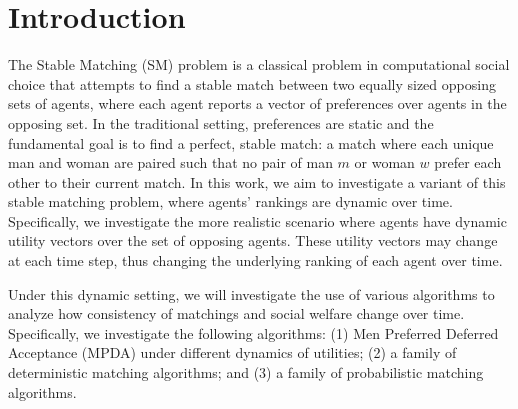 \section{Introduction}
 
The Stable Matching (SM) problem is a classical problem in computational social choice that attempts to find a stable match between two equally sized opposing sets of agents, where each agent reports a vector of preferences over agents in the opposing set. In the traditional setting, preferences are static and the fundamental goal is to find a perfect, stable match: a match where each unique man and woman are paired such that no pair of man $m$ or woman $w$ prefer each other to their current match. In this work, we aim to investigate a variant of this stable matching problem, where agents' rankings are dynamic over time. Specifically, we investigate the more realistic scenario where agents have dynamic utility vectors over the set of opposing agents. These utility vectors may change at each time step, thus changing the underlying ranking of each agent over time.

Under this dynamic setting, we will investigate the use of various algorithms to analyze how consistency of matchings and social welfare change over time. Specifically, we investigate the following algorithms: (1) Men Preferred Deferred Acceptance (MPDA) under different dynamics of utilities; (2) a family of deterministic matching algorithms; and (3) a family of probabilistic matching algorithms.
